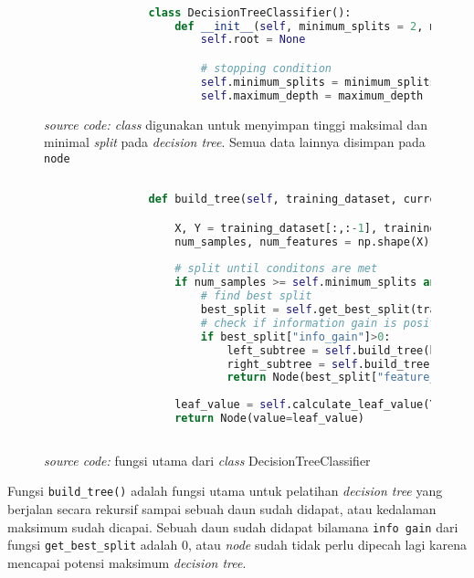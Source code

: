 		\begin{figure}[H]
			\begin{lstlisting}[language=Python, basicstyle=\tiny]

				class DecisionTreeClassifier():
					def __init__(self, minimum_splits = 2, maximum_depth = 2):
						self.root = None

						# stopping condition
						self.minimum_splits = minimum_splits
						self.maximum_depth = maximum_depth

			\end{lstlisting}
			\caption{\emph{source code: class} digunakan untuk menyimpan tinggi maksimal dan minimal 
			\textit{split} pada \emph{decision tree}. Semua data lainnya disimpan pada \texttt{node}}
			\label{code: DecisionTreeClassifier class}
		\end{figure}

		\begin{figure}[H]
			\begin{lstlisting}[language=Python, basicstyle=\tiny]
						
				def build_tree(self, training_dataset, current_depth = 0):

					X, Y = training_dataset[:,:-1], training_dataset[:,-1]
					num_samples, num_features = np.shape(X)
			
					# split until conditons are met
					if num_samples >= self.minimum_splits and current_depth <= self.maximum_depth:
						# find best split
						best_split = self.get_best_split(training_dataset, num_features)
						# check if information gain is positive
						if best_split["info_gain"]>0:
							left_subtree = self.build_tree(best_split["dataset_left"], current_depth+1)
							right_subtree = self.build_tree(best_split["dataset_right"], current_depth+1)
							return Node(best_split["feature_index"], best_split["threshold"], left_subtree, right_subtree, best_split["info_gain"])
						
					leaf_value = self.calculate_leaf_value(Y)
					return Node(value=leaf_value)
					
			\end{lstlisting}
			\caption{\emph{source code:} fungsi utama dari \emph{class} DecisionTreeClassifier}
			\label{code: build tree function}
		\end{figure}

		Fungsi \texttt{build\_tree()} adalah fungsi utama untuk pelatihan \emph{decision tree} yang berjalan secara 
		rekursif sampai sebuah daun sudah didapat, atau kedalaman maksimum sudah dicapai. 
		Sebuah daun sudah didapat bilamana \texttt{info gain} dari fungsi \texttt{get\_best\_split} adalah 0, 
		atau \textit{node} sudah tidak perlu dipecah lagi karena mencapai potensi maksimum \textit{decision tree}.

